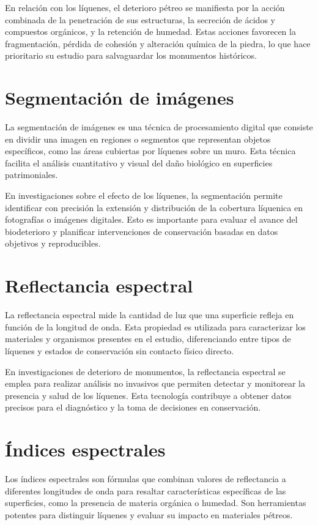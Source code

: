 En relación con los líquenes, el deterioro pétreo se manifiesta por la acción combinada de la penetración de sus estructuras, la secreción de ácidos y compuestos orgánicos, y la retención de humedad. Estas acciones favorecen la fragmentación, pérdida de cohesión y alteración química de la piedra, lo que hace prioritario su estudio para salvaguardar los monumentos históricos.
\section{Segmentación de imágenes}
La segmentación de imágenes es una técnica de procesamiento digital que consiste en dividir una imagen en regiones o segmentos que representan objetos específicos, como las áreas cubiertas por líquenes sobre un muro. Esta técnica facilita el análisis cuantitativo y visual del daño biológico en superficies patrimoniales.

En investigaciones sobre el efecto de los líquenes, la segmentación permite identificar con precisión la extensión y distribución de la cobertura líquenica en fotografías o imágenes digitales. Esto es importante para evaluar el avance del biodeterioro y planificar intervenciones de conservación basadas en datos objetivos y reproducibles.
\section{Reflectancia espectral}
La reflectancia espectral mide la cantidad de luz que una superficie refleja en función de la longitud de onda. Esta propiedad es utilizada para caracterizar los materiales y organismos presentes en el estudio, diferenciando entre tipos de líquenes y estados de conservación sin contacto físico directo.

En investigaciones de deterioro de monumentos, la reflectancia espectral se emplea para realizar análisis no invasivos que permiten detectar y monitorear la presencia y salud de los líquenes. Esta tecnología contribuye a obtener datos precisos para el diagnóstico y la toma de decisiones en conservación.
\section{Índices espectrales}
Los índices espectrales son fórmulas que combinan valores de reflectancia a diferentes longitudes de onda para resaltar características específicas de las superficies, como la presencia de materia orgánica o humedad. Son herramientas potentes para distinguir líquenes y evaluar su impacto en materiales pétreos.

